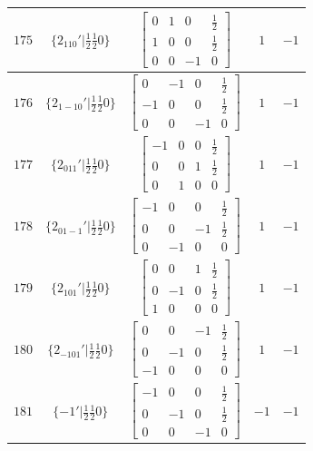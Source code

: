 \documentclass[fleqn,8pt]{jsarticle}
\begin{document}
\begin{longtable}{ccccc}
$ 175 $ & $ \{2{}_{110}{}'|\frac{1}{2} \frac{1}{2} 0\} $ & $ \begin{bmatrix} 0 & 1 & 0 & \frac{1}{2} \\ 1 & 0 & 0 & \frac{1}{2} \\ 0 & 0 & -1 & 0 \end{bmatrix} $ & $ 1 $ & $ -1 $ \\ \hline
$ 176 $ & $ \{2{}_{1-10}{}'|\frac{1}{2} \frac{1}{2} 0\} $ & $ \begin{bmatrix} 0 & -1 & 0 & \frac{1}{2} \\ -1 & 0 & 0 & \frac{1}{2} \\ 0 & 0 & -1 & 0 \end{bmatrix} $ & $ 1 $ & $ -1 $ \\ \hline
$ 177 $ & $ \{2{}_{011}{}'|\frac{1}{2} \frac{1}{2} 0\} $ & $ \begin{bmatrix} -1 & 0 & 0 & \frac{1}{2} \\ 0 & 0 & 1 & \frac{1}{2} \\ 0 & 1 & 0 & 0 \end{bmatrix} $ & $ 1 $ & $ -1 $ \\ \hline
$ 178 $ & $ \{2{}_{01-1}{}'|\frac{1}{2} \frac{1}{2} 0\} $ & $ \begin{bmatrix} -1 & 0 & 0 & \frac{1}{2} \\ 0 & 0 & -1 & \frac{1}{2} \\ 0 & -1 & 0 & 0 \end{bmatrix} $ & $ 1 $ & $ -1 $ \\ \hline
$ 179 $ & $ \{2{}_{101}{}'|\frac{1}{2} \frac{1}{2} 0\} $ & $ \begin{bmatrix} 0 & 0 & 1 & \frac{1}{2} \\ 0 & -1 & 0 & \frac{1}{2} \\ 1 & 0 & 0 & 0 \end{bmatrix} $ & $ 1 $ & $ -1 $ \\ \hline
$ 180 $ & $ \{2{}_{-101}{}'|\frac{1}{2} \frac{1}{2} 0\} $ & $ \begin{bmatrix} 0 & 0 & -1 & \frac{1}{2} \\ 0 & -1 & 0 & \frac{1}{2} \\ -1 & 0 & 0 & 0 \end{bmatrix} $ & $ 1 $ & $ -1 $ \\ \hline
$ 181 $ & $ \{-1{}'|\frac{1}{2} \frac{1}{2} 0\} $ & $ \begin{bmatrix} -1 & 0 & 0 & \frac{1}{2} \\ 0 & -1 & 0 & \frac{1}{2} \\ 0 & 0 & -1 & 0 \end{bmatrix} $ & $ -1 $ & $ -1 $ \\ \hline

\end{longtable}
\end{document}
